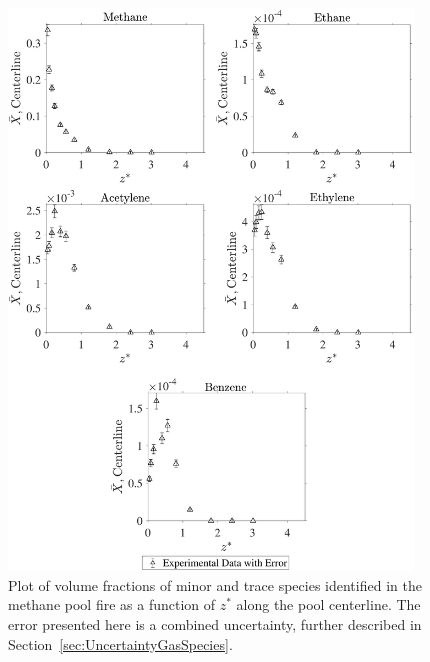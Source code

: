 \documentclass[12pt]{article}
\begin{document}
\begin{figure}[!h]
	\centering
\includegraphics[width=10.75cm,keepaspectratio]{Methane_Inter_MOL_FRAC_Plot.pdf}
	\caption[Volume fractions of minor and trace species in the methane plume]{Plot of volume fractions of minor and trace species identified in the methane pool fire as a function of $z^{*}$ along the pool centerline. The error presented here is a combined uncertainty, further described in Section~\ref{sec:UncertaintyGasSpecies}.}
	\label{fig:Methane_VOL_Frac_Inter}
\end{figure}

\pagebreak
\end{document}
